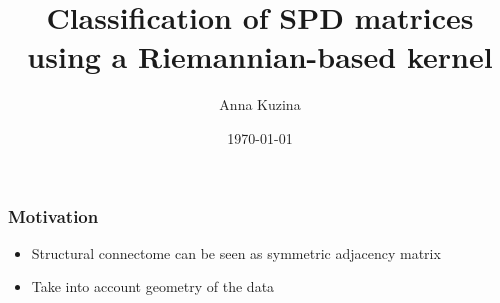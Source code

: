 \documentclass{beamer}
\title[Classification of SPD matrices]{Classiﬁcation of SPD matrices using a Riemannian-based kernel} %
\author{Anna Kuzina} %
\institute[Skoltech] %
{
Skoltech \\ %
\medskip
\textit{anna.kuzina@skoltech.ru} %
}
\date{\today} %
\begin{document}
\begin{frame}
\titlepage %
\end{frame}





\begin{frame}
\frametitle{Motivation}
\begin{itemize}
\item<1-> 	Structural connectome can be seen as symmetric adjacency matrix
\vfill 
\item<2-> Take into account geometry of the data

\end{itemize}

\end{frame}

\end{document}
